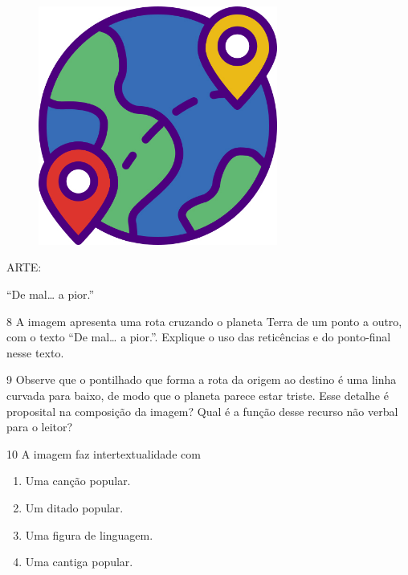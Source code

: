 \begin{figure}
\includegraphics[width=0.7\textwidth]{./imgSAEB_6_POR/freepik/PORT_6_IMG-17.jpeg}
\end{figure}

ARTE:

``De mal\ldots{} a pior.''

\num{8} A imagem apresenta uma rota cruzando o planeta Terra de um ponto
a outro, com o texto ``De mal\ldots{} a pior.''. Explique o uso das
reticências e do ponto-final nesse texto.


\num{9} Observe que o pontilhado que forma a rota da origem ao destino é
uma linha curvada para baixo, de modo que o planeta parece estar triste.
Esse detalhe é proposital na composição da imagem? Qual é a função desse
recurso não verbal para o leitor?


\num{10} A imagem faz intertextualidade com

\begin{enumerate}
\def\labelenumi{\alph{enumi})}
\item Uma canção popular.
\item Um ditado popular.
\item Uma figura de linguagem.
\item Uma cantiga popular.
\end{enumerate}

